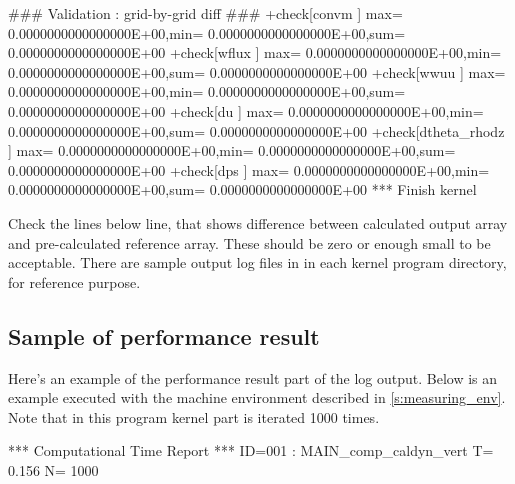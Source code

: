\begin{LstLog}
 ### Validation : grid-by-grid diff ###
 +check[convm           ] max=  0.0000000000000000E+00,min=  0.0000000000000000E+00,sum=  0.0000000000000000E+00
 +check[wflux           ] max=  0.0000000000000000E+00,min=  0.0000000000000000E+00,sum=  0.0000000000000000E+00
 +check[wwuu            ] max=  0.0000000000000000E+00,min=  0.0000000000000000E+00,sum=  0.0000000000000000E+00
 +check[du              ] max=  0.0000000000000000E+00,min=  0.0000000000000000E+00,sum=  0.0000000000000000E+00
 +check[dtheta_rhodz    ] max=  0.0000000000000000E+00,min=  0.0000000000000000E+00,sum=  0.0000000000000000E+00
 +check[dps             ] max=  0.0000000000000000E+00,min=  0.0000000000000000E+00,sum=  0.0000000000000000E+00
 *** Finish kernel
\end{LstLog}

Check the lines below  line,
that shows difference between calculated output array and
pre-calculated reference array.
These should be zero or enough small to be acceptable.
%
There are sample output log files in 
in each kernel program directory, for reference purpose.

\subsection{Sample of performance result}

Here's an example of the performance result part of the log output.
Below is an example executed with the machine environment described in \autoref{s:measuring_env}.
%
Note that in this program kernel part is iterated 1000 times.

\begin{LstLog}
 *** Computational Time Report
 *** ID=001 : MAIN_comp_caldyn_vert            T=     0.156 N=   1000
\end{LstLog}

